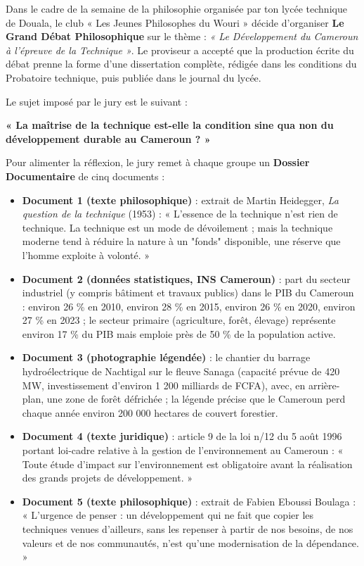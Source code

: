 \documentclass[11pt]{article}
\newcounter{popsec}
\newcounter{popsub}
\newcommand{\courssub}[1]{%
  \stepcounter{popsub}%
  \par\vspace{9pt}\noindent{\popxbold\fontsize{11.5}{13}\selectfont\color{popink}{\color{poporange}\thepopsec.\thepopsub}\hspace{6pt}#1}\par\nopagebreak\vspace{4pt}
}
\begin{document}
\courssub{Situation}

Dans le cadre de la semaine de la philosophie organisée par ton lycée technique de Douala, le club « Les Jeunes Philosophes du Wouri » décide d'organiser \textbf{Le Grand Débat Philosophique} sur le thème : \emph{« Le Développement du Cameroun à l'épreuve de la Technique »}. Le proviseur a accepté que la production écrite du débat prenne la forme d'une dissertation complète, rédigée dans les conditions du Probatoire technique, puis publiée dans le journal du lycée.

Le sujet imposé par le jury est le suivant :

\begin{center}
\textbf{« La maîtrise de la technique est-elle la condition sine qua non du développement durable au Cameroun ? »}
\end{center}

Pour alimenter la réflexion, le jury remet à chaque groupe un \textbf{Dossier Documentaire} de cinq documents :

\begin{itemize}
\item \textbf{Document 1 (texte philosophique)} : extrait de Martin Heidegger, \emph{La question de la technique} (1953) : « L'essence de la technique n'est rien de technique. La technique est un mode de dévoilement ; mais la technique moderne tend à réduire la nature à un "fonds" disponible, une réserve que l'homme exploite à volonté. »
\item \textbf{Document 2 (données statistiques, INS Cameroun)} : part du secteur industriel (y compris bâtiment et travaux publics) dans le PIB du Cameroun : environ 26 \% en 2010, environ 28 \% en 2015, environ 26 \% en 2020, environ 27 \% en 2023 ; le secteur primaire (agriculture, forêt, élevage) représente environ 17 \% du PIB mais emploie près de 50 \% de la population active.
\item \textbf{Document 3 (photographie légendée)} : le chantier du barrage hydroélectrique de Nachtigal sur le fleuve Sanaga (capacité prévue de 420 MW, investissement d'environ 1 200 milliards de FCFA), avec, en arrière-plan, une zone de forêt défrichée ; la légende précise que le Cameroun perd chaque année environ 200 000 hectares de couvert forestier.
\item \textbf{Document 4 (texte juridique)} : article 9 de la loi n/12 du 5 août 1996 portant loi-cadre relative à la gestion de l'environnement au Cameroun : « Toute étude d'impact sur l'environnement est obligatoire avant la réalisation des grands projets de développement. »
\item \textbf{Document 5 (texte philosophique)} : extrait de Fabien Eboussi Boulaga : « L'urgence de penser : un développement qui ne fait que copier les techniques venues d'ailleurs, sans les repenser à partir de nos besoins, de nos valeurs et de nos communautés, n'est qu'une modernisation de la dépendance. »
\end{itemize}
\end{document}

